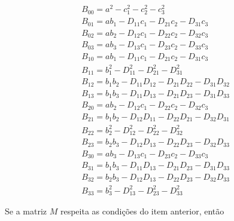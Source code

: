 \documentclass[10pt,a4paper]{article}
\begin{document}
\begin{eqnarray}
	B_{00} = a^2 -c_1^2 - c_2^2 - c_3^2 \nonumber\\
	B_{01} = ab_1 - D_{11}c_1 - D_{21}c_2 - D_{31}c_3 \nonumber\\
	B_{02} = ab_2 - D_{12}c_1 - D_{22}c_2 - D_{32}c_3 \nonumber\\
	B_{03} = ab_3 - D_{13}c_1 - D_{23}c_2 - D_{33}c_3 \nonumber\\
	B_{10} = ab_1 - D_{11}c_1 - D_{21}c_2 - D_{31}c_3 \nonumber\\
	B_{11} = b_1^2 - D_{11}^2 - D_{21}^2 - D_{31}^2 \nonumber\\
	B_{12} = b_1b_2 - D_{11}D_{12} - D_{21}D_{22} - D_{31}D_{32} \nonumber\\
	B_{13} = b_1b_3 - D_{11}D_{13} - D_{21}D_{23} - D_{31}D_{33} \nonumber\\
	B_{20} = ab_2 - D_{12}c_1 - D_{22}c_2 - D_{32}c_3 \nonumber\\
	B_{21} = b_1b_2 - D_{12}D_{11} - D_{22}D_{21} - D_{32}D_{31} \nonumber\\
	B_{22} = b_2^2 - D_{12}^2 - D_{22}^2 - D_{32}^2 \nonumber\\
	B_{23} = b_2b_3 - D_{12}D_{13} - D_{22}D_{23} - D_{32}D_{33} \nonumber\\
	B_{30} = ab_3 - D_{13}c_1 - D_{23}c_2 - D_{33}c_3 \nonumber\\
	B_{31} = b_1b_3 - D_{11}D_{13} - D_{21}D_{23} - D_{31}D_{33} \nonumber\\
	B_{32} = b_2b_3 - D_{12}D_{13} - D_{22}D_{23} - D_{32}D_{33} \nonumber\\
	B_{33} = b_3^2 - D_{13}^2 - D_{23}^2 - D_{33}^2 \nonumber
\end{eqnarray}

Se a matriz $ M $ respeita as condições do item anterior, então
\end{document}
